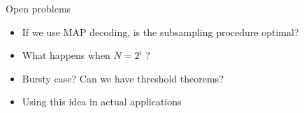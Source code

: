 %		
%		
\begin{frame}{Open problems}
\begin{itemize}
  \item If we use MAP decoding, is the subsampling procedure optimal?
  \item What happens when $N=2^i$ ?
  \item Bursty case? Can we have threshold theorems?
  \item Using this idea in actual applications
\end{itemize}
\end{frame} 